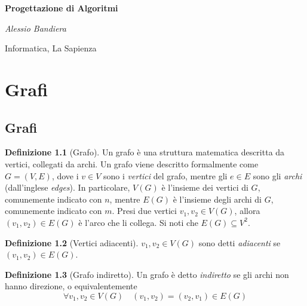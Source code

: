 \documentclass[14pt]{extreport}
\theoremstyle{definition}
\newtheorem{definition}{Definizione}[section]
\theoremstyle{remark}
\begin{document}
\begin{titlepage}
    \centering
    \vspace*{1cm}

    \textbf{\huge Progettazione di Algoritmi}

    \vspace{1.5cm}

    \textit{\Large Alessio Bandiera}

    \vfill
        
    \large Informatica, La Sapienza
\end{titlepage}

\tableofcontents

\pagebreak


\chapter{Grafi}

\section{Grafi}

\begin{definition}[Grafo]
    Un grafo è una struttura matematica descritta da vertici, collegati da archi. Un grafo viene descritto formalmente come $G=(V, E)$, dove i $v \in V$ sono i \textit{vertici} del grafo, mentre gli $e \in E$ sono gli \textit{archi} (dall'inglese \textit{edges}). In particolare, $V(G)$ è l'insieme dei vertici di $G$, comunemente indicato con $n$, mentre $E(G)$ è l'insieme degli archi di $G$, comunemente indicato con $m$. Presi due vertici $v_1,v_2 \in V(G)$, allora $(v_1, v_2) \in E(G)$ è l'arco che li collega. Si noti che $E(G) \subseteq V^2$.
\end{definition}

\begin{definition}[Vertici adiacenti]
    $v_1, v_2 \in V(G)$ sono detti \textit{adiacenti} se $(v_1, v_2) \in E(G)$.
\end{definition}

\begin{definition}[Grafo indiretto]
    Un grafo è detto \textit{indiretto} se gli archi non hanno direzione, o equivalentemente $$\forall v_1, v_2 \in V(G) \quad (v_1, v_2) = (v_2, v_1) \in E(G)$$
\end{definition}
\end{document}
